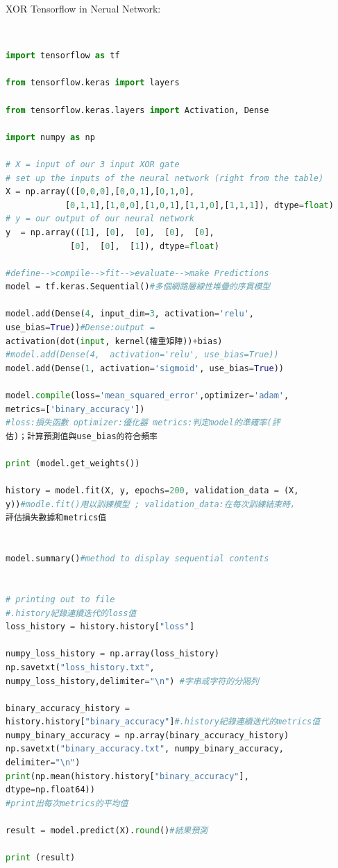 \documentclass[12pt,a4paper]{article}
\begin{document}
\begin{Large}XOR Tensorflow in Nerual Network:\end{Large}\\[6pt]
\begin{lstlisting}[language=python]
import tensorflow as tf

from tensorflow.keras import layers

from tensorflow.keras.layers import Activation, Dense

import numpy as np

# X = input of our 3 input XOR gate
# set up the inputs of the neural network (right from the table)
X = np.array(([0,0,0],[0,0,1],[0,1,0], 
            [0,1,1],[1,0,0],[1,0,1],[1,1,0],[1,1,1]), dtype=float)
# y = our output of our neural network
y  = np.array(([1], [0],  [0],  [0],  [0], 
             [0],  [0],  [1]), dtype=float)

#define-->compile-->fit-->evaluate-->make Predictions
model = tf.keras.Sequential()#多個網路層線性堆疊的序貫模型

model.add(Dense(4, input_dim=3, activation='relu',
use_bias=True))#Dense:output = 
activation(dot(input, kernel(權重矩陣))+bias)
#model.add(Dense(4,  activation='relu', use_bias=True))
model.add(Dense(1, activation='sigmoid', use_bias=True))

model.compile(loss='mean_squared_error',optimizer='adam',
metrics=['binary_accuracy'])
#loss:損失函數 optimizer:優化器 metrics:判定model的準確率(評
估)；計算預測值與use_bias的符合頻率

print (model.get_weights())

history = model.fit(X, y, epochs=200, validation_data = (X, 
y))#modle.fit()用以訓練模型 ; validation_data:在每次訓練結束時，
評估損失數據和metrics值


model.summary()#method to display sequential contents


# printing out to file
#.history紀錄連續迭代的loss值
loss_history = history.history["loss"]

numpy_loss_history = np.array(loss_history)
np.savetxt("loss_history.txt", 
numpy_loss_history,delimiter="\n") #字串或字符的分隔列

binary_accuracy_history = 
history.history["binary_accuracy"]#.history紀錄連續迭代的metrics值
numpy_binary_accuracy = np.array(binary_accuracy_history)
np.savetxt("binary_accuracy.txt", numpy_binary_accuracy, 
delimiter="\n")
print(np.mean(history.history["binary_accuracy"],
dtype=np.float64))
#print出每次metrics的平均值

result = model.predict(X).round()#結果預測

print (result)
\end{lstlisting}
\end{document}
